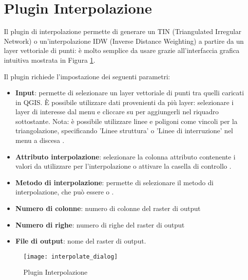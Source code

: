 
\section{Plugin Interpolazione}\label{sec:interpol}


Il plugin di interpolazione permette di generare un TIN (Triangulated Irregular Network) 
o un'interpolazione IDW (Inverse Distance Weighting) a partire da un layer vettoriale di
punti: è molto semplice da usare grazie all'interfaccia grafica intuitiva mostrata 
in Figura \ref{fig:interpolation_dialog}.

Il plugin richiede l'impostazione dei seguenti parametri:
\begin{itemize}[label=--]
\item \textbf{Input}: permette di selezionare un layer vettoriale di punti tra quelli caricati in QGIS. 
È possibile utilizzare dati provenienti da più layer: selezionare i layer di interesse dal menu 
 e cliccare su  per aggiungerli nel riquadro sottostante.
Nota: è possibile utilizzare linee e poligoni come vincoli per la triangolazione, specificando 
'Linee struttura' o 'Linee di interruzione' nel menu a discesa .
\item \textbf{Attributo interpolazione}: selezionare la colonna attributo contenente i valori 
da utilizzare per l'interpolazione o attivare la casella di controllo 
.
\item \textbf{Metodo di interpolazione}: permette di selezionare il metodo di interpolazione, che può essere 
 o 
.
\item \textbf{Numero di colonne}: numero di colonne del raster di output
\item \textbf{Numero di righe}: numero di righe del raster di output
\item \textbf{File di output}: nome del raster di output.
\end{itemize}

\begin{figure}[ht]
   \centering
   \texttt{[image: interpolate\_dialog]}
   \caption{Plugin Interpolazione \nixcaption}\label{fig:interpolation_dialog}
\end{figure}

